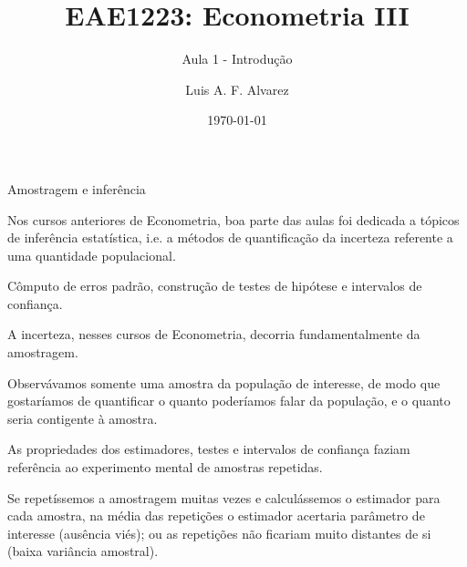 \documentclass[11pt]{beamer}
\author{Luis A. F. Alvarez}
\title{EAE1223: Econometria III}
\subtitle{Aula 1 - Introdução}
\date{\today}
\newenvironment{halfwideitemize}{\itemize\addtolength{\itemsep}{0.5em}}{\enditemize}
\begin{document}
	\begin{frame}[plain]
	\maketitle
	\end{frame}
	\begin{frame}{Amostragem e inferência}
		\begin{halfwideitemize}
			\item Nos cursos anteriores de Econometria, boa parte das aulas foi dedicada a tópicos de {\color{blue}inferência estatística}, i.e. a métodos de quantificação da {\color{blue}incerteza} referente a uma quantidade populacional.
			\begin{halfwideitemize}
				\item Cômputo de erros padrão, construção de testes de hipótese e intervalos de confiança.
			\end{halfwideitemize}
			\item A  incerteza, nesses cursos de Econometria, decorria fundamentalmente da {\color{blue}amostragem}.
			\begin{halfwideitemize}
				\item 	Observávamos somente uma amostra da população de interesse, de modo que gostaríamos de quantificar o quanto poderíamos falar da população, e o quanto seria contigente à amostra.
			\end{halfwideitemize}
		
			\item As propriedades dos estimadores, testes e intervalos de confiança faziam referência ao experimento mental de amostras repetidas.
			\begin{halfwideitemize}
				\item Se repetíssemos a amostragem muitas vezes e calculássemos o estimador para cada amostra, na média das repetições o estimador acertaria parâmetro de interesse (ausência viés); ou as repetições não ficariam muito distantes de si (baixa variância amostral). 
			\end{halfwideitemize}
		\end{halfwideitemize}
	\end{frame}
\end{document}

